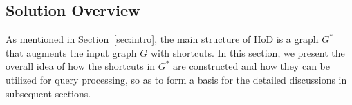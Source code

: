 \documentclass{sig-alternate}
\def\figcapup{\vspace{-2mm}}
\def\figcapdown{\vspace{-3mm}}
\def\G{G^*}
\begin{document}
\begin{sloppy}
%
%
%
%
%





\section{Solution Overview}\label{sec:overview}

As mentioned in Section~\ref{sec:intro}, the main structure of HoD is a graph $\G$ that augments the input graph $G$ with shortcuts. In this section, we present the overall idea of how the shortcuts in $\G$ are constructed and how they can be utilized for query processing, so as to form a basis for the detailed discussions in subsequent sections.



\end{sloppy}
\end{document}
